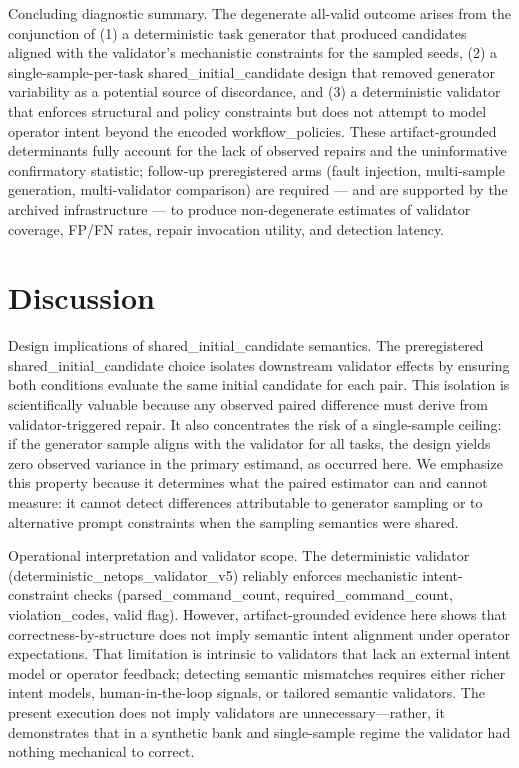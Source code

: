 \documentclass[conference]{IEEEtran}
\begin{document}
Concluding diagnostic summary. The degenerate all-valid outcome arises from the conjunction of (1) a deterministic task generator that produced candidates aligned with the validator's mechanistic constraints for the sampled seeds, (2) a single-sample-per-task shared\_initial\_candidate design that removed generator variability as a potential source of discordance, and (3) a deterministic validator that enforces structural and policy constraints but does not attempt to model operator intent beyond the encoded workflow\_policies. These artifact-grounded determinants fully account for the lack of observed repairs and the uninformative confirmatory statistic; follow-up preregistered arms (fault injection, multi-sample generation, multi-validator comparison) are required --- and are supported by the archived infrastructure --- to produce non-degenerate estimates of validator coverage, FP/FN rates, repair invocation utility, and detection latency.

\section{Discussion}
Design implications of shared\_initial\_candidate semantics. The preregistered shared\_initial\_candidate choice isolates downstream validator effects by ensuring both conditions evaluate the same initial candidate for each pair. This isolation is scientifically valuable because any observed paired difference must derive from validator-triggered repair. It also concentrates the risk of a single-sample ceiling: if the generator sample aligns with the validator for all tasks, the design yields zero observed variance in the primary estimand, as occurred here. We emphasize this property because it determines what the paired estimator can and cannot measure: it cannot detect differences attributable to generator sampling or to alternative prompt constraints when the sampling semantics were shared.

Operational interpretation and validator scope. The deterministic validator (deterministic\_netops\_validator\_v5) reliably enforces mechanistic intent-constraint checks (parsed\_command\_count, required\_command\_count, violation\_codes, valid flag). However, artifact-grounded evidence here shows that correctness-by-structure does not imply semantic intent alignment under operator expectations. That limitation is intrinsic to validators that lack an external intent model or operator feedback; detecting semantic mismatches requires either richer intent models, human-in-the-loop signals, or tailored semantic validators. The present execution does not imply validators are unnecessary---rather, it demonstrates that in a synthetic bank and single-sample regime the validator had nothing mechanical to correct.
\end{document}
